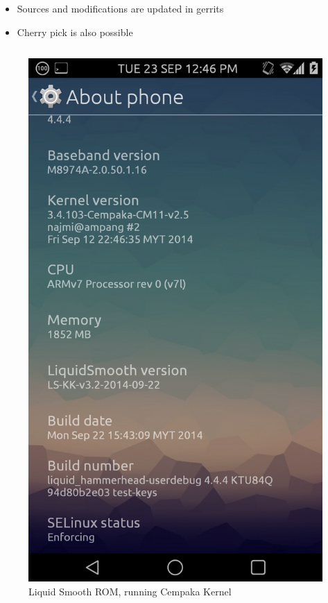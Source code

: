 \documentclass{beamer}
\begin{document}
\begin{frame}
 \begin{itemize}
  \item Sources and modifications are updated in gerrits
  \item Cherry pick is also possible  
 \end{itemize}
\end{frame}

{
\begin{frame}
\begin{columns}[t]
 
 \begin{column}{5cm}
  
 \begin{figure}
 \includegraphics[scale=0.1]{ls}
   \caption{\tiny{Liquid Smooth ROM, running Cempaka Kernel}}
 \end{figure}


\end{column}
\end{columns}
\end{frame}}
\end{document}

